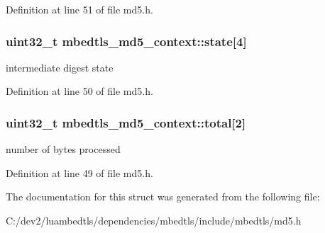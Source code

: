 Definition at line 51 of file md5.\-h.

\hypertarget{structmbedtls__md5__context_a17e9e7e1ab79b648e787969ee5b73929}{
\subsubsection[{state}]{\setlength{\rightskip}{0pt plus 5cm}uint32\-\_\-t mbedtls\-\_\-md5\-\_\-context\-::state\mbox{[}4\mbox{]}}}\label{structmbedtls__md5__context_a17e9e7e1ab79b648e787969ee5b73929}
intermediate digest state 

Definition at line 50 of file md5.\-h.

\hypertarget{structmbedtls__md5__context_a69e02fc353b932fe9f58fcae64506c6e}{
\subsubsection[{total}]{\setlength{\rightskip}{0pt plus 5cm}uint32\-\_\-t mbedtls\-\_\-md5\-\_\-context\-::total\mbox{[}2\mbox{]}}}\label{structmbedtls__md5__context_a69e02fc353b932fe9f58fcae64506c6e}
number of bytes processed 

Definition at line 49 of file md5.\-h.



The documentation for this struct was generated from the following file\-:\begin{DoxyCompactItemize}
\item 
C\-:/dev2/luambedtls/dependencies/mbedtls/include/mbedtls/md5.\-h\end{DoxyCompactItemize}

